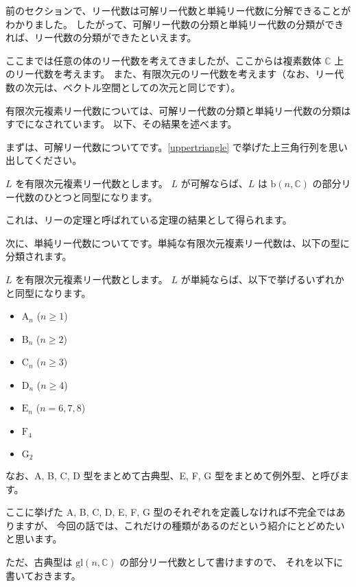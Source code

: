 \documentclass{ltjsarticle}
\begin{document}
前のセクションで、リー代数は可解リー代数と単純リー代数に分解できることがわかりました。
したがって、可解リー代数の分類と単純リー代数の分類ができれば、リー代数の分類ができたといえます。

ここまでは任意の体のリー代数を考えてきましたが、ここからは複素数体 \(\mathbb{C}\) 上のリー代数を考えます。
また、有限次元のリー代数を考えます（なお、リー代数の次元は、ベクトル空間としての次元と同じです）。

有限次元複素リー代数については、可解リー代数の分類と単純リー代数の分類はすでになされています。
以下、その結果を述べます。

まずは、可解リー代数についてです。\autoref{uppertriangle} で挙げた上三角行列を思い出してください。

\begin{usmtheorem}[可解リー代数の分類]
    \(L\) を有限次元複素リー代数とします。
    \(L\) が可解ならば、\(L\) は \(\mathrm{b}(n,\mathbb{C})\) の部分リー代数のひとつと同型になります。
\end{usmtheorem}

これは、リーの定理と呼ばれている定理の結果として得られます。

次に、単純リー代数についてです。単純な有限次元複素リー代数は、以下の型に分類されます。

\begin{usmtheorem}[単純リー代数の分類]
    \(L\) を有限次元複素リー代数とします。
    \(L\) が単純ならば、以下で挙げるいずれかと同型になります。
    \begin{itemize}
        \item \(\mathrm{A}_n\) (\(n \geq 1\))
        \item \(\mathrm{B}_n\) (\(n \geq 2\))
        \item \(\mathrm{C}_n\) (\(n \geq 3\))
        \item \(\mathrm{D}_n\) (\(n \geq 4\))
        \item \(\mathrm{E}_n\) (\(n = 6,7,8\))
        \item \(\mathrm{F}_4\)
        \item \(\mathrm{G}_2\)
    \end{itemize}
    なお、A, B, C, D 型をまとめて古典型、E, F, G 型をまとめて例外型、と呼びます。
\end{usmtheorem}

ここに挙げた A, B, C, D, E, F, G 型のそれぞれを定義しなければ不完全ではありますが、
今回の話では、これだけの種類があるのだという紹介にとどめたいと思います。

ただ、古典型は \(\mathrm{gl}(n,\mathbb{C})\) の部分リー代数として書けますので、
それを以下に書いておきます。
\end{document}
